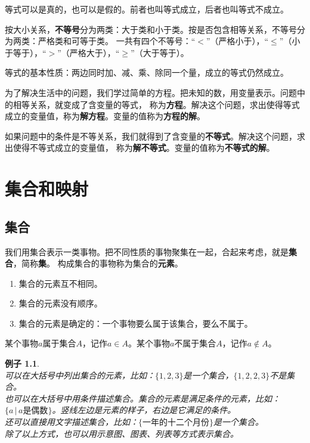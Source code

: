\documentclass[12pt,UTF8]{ctexbook}
\newtheorem{ex}{例子}[section]
\begin{document}
等式可以是真的，也可以是假的。前者也叫等式成立，后者也叫等式不成立。

按大小关系，\textbf{不等号}分为两类：大于类和小于类。按是否包含相等关系，不等号分为两类：严格类和可等于类。
一共有四个不等号：“$<$”（严格小于），“$\leqslant$”（小于等于），“$>$”（严格大于），“$\geqslant$”（大于等于）。

等式的基本性质：两边同时加、减、乘、除同一个量，成立的等式仍然成立。

为了解决生活中的问题，我们学过简单的方程。把未知的数，用变量表示。问题中的相等关系，就变成了含变量的等式，
称为\textbf{方程}。解决这个问题，求出使得等式成立的变量值，称为\textbf{解方程}。变量的值称为\textbf{方程的解}。

如果问题中的条件是不等关系，我们就得到了含变量的\textbf{不等式}。解决这个问题，求出使得不等式成立的变量值，
称为\textbf{解不等式}。变量的值称为\textbf{不等式的解}。

\chapter{集合和映射}
\section{集合}
我们用集合表示一类事物。把不同性质的事物聚集在一起，合起来考虑，就是\textbf{集合}，简称\textbf{集}。
构成集合的事物称为集合的\textbf{元素}。
\begin{enumerate}
    \item 集合的元素互不相同。
    \item 集合的元素没有顺序。
    \item 集合的元素是确定的：一个事物要么属于该集合，要么不属于。
\end{enumerate}

某个事物$a$属于集合$A$，记作$a\in A$。某个事物$a$不属于集合$A$，记作$a\notin A$。

\begin{ex}\label{ex:2-0-0}
    \mbox{} \\ 
    \indent 可以在大括号中列出集合的元素，比如：$\{1,2,3\}$是一个集合，$\{1,2,2,3\}$不是集合。 \\
    \indent 也可以在大括号中用条件描述集合。集合的元素是满足条件的元素，比如：$\{ a\, |\, a\mbox{是偶数}\}$。竖线左边是元素的样子，右边是它满足的条件。\\
    \indent 还可以直接用文字描述集合，比如：$\{\mbox{一年的十二个月份}\}$是一个集合。\\
    \indent 除了以上方式，也可以用示意图、图表、列表等方式表示集合。
\end{ex}
\end{document}
